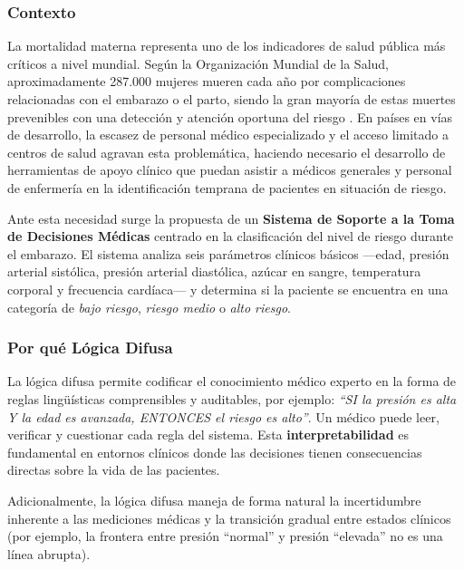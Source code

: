 \documentclass[11pt]{article}
\begin{document}
\subsubsection*{Contexto}

La mortalidad materna representa uno de los indicadores de salud p\'ublica m\'as cr\'iticos a nivel mundial. Seg\'un la Organizaci\'on Mundial de la Salud, aproximadamente 287.000 mujeres mueren cada a\~no por complicaciones relacionadas con el embarazo o el parto, siendo la gran mayor\'ia de estas muertes prevenibles con una detecci\'on y atenci\'on oportuna del riesgo \cite{who2023}. En pa\'ises en v\'ias de desarrollo, la escasez de personal m\'edico especializado y el acceso limitado a centros de salud agravan esta problem\'atica, haciendo necesario el desarrollo de herramientas de apoyo cl\'inico que puedan asistir a m\'edicos generales y personal de enfermer\'ia en la identificaci\'on temprana de pacientes en situaci\'on de riesgo.

Ante esta necesidad surge la propuesta de un \textbf{Sistema de Soporte a la Toma de Decisiones M\'edicas} centrado en la clasificaci\'on del nivel de riesgo durante el embarazo. El sistema analiza seis par\'ametros cl\'inicos b\'asicos ---edad, presi\'on arterial sist\'olica, presi\'on arterial diast\'olica, az\'ucar en sangre, temperatura corporal y frecuencia card\'iaca--- y determina si la paciente se encuentra en una categor\'ia de \textit{bajo riesgo}, \textit{riesgo medio} o \textit{alto riesgo}.

\subsubsection*{Por qué Lógica Difusa}

La l\'ogica difusa \cite{zadeh1965} permite codificar el conocimiento m\'edico experto en la forma de reglas ling\"u\'isticas comprensibles y auditables, por ejemplo: \textit{``SI la presi\'on es alta Y la edad es avanzada, ENTONCES el riesgo es alto''}. Un m\'edico puede leer, verificar y cuestionar cada regla del sistema. Esta \textbf{interpretabilidad} es fundamental en entornos cl\'inicos donde las decisiones tienen consecuencias directas sobre la vida de las pacientes.

Adicionalmente, la l\'ogica difusa maneja de forma natural la incertidumbre inherente a las mediciones m\'edicas y la transici\'on gradual entre estados cl\'inicos (por ejemplo, la frontera entre presi\'on ``normal'' y presi\'on ``elevada'' no es una l\'inea abrupta).
\end{document}
